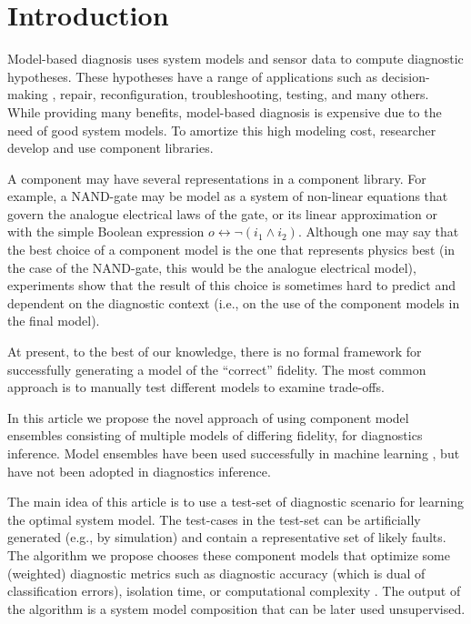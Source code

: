 \section{Introduction}
%
Model-based diagnosis \cite{dekleer87diagnosing} uses system models
and sensor data to compute diagnostic hypotheses. These hypotheses
have a range of applications such as decision-making
\cite{feldman13genius}, repair, reconfiguration, troubleshooting,
testing, and many others. While providing many benefits, model-based
diagnosis is expensive due to the need of good system models. To
amortize this high modeling cost, researcher develop and use component
libraries.
\par
A component may have several representations in a component
library. For example, a NAND-gate may be model as a system of
non-linear equations that govern the analogue electrical laws of the
gate, or its linear approximation or with the simple Boolean
expression $o \leftrightarrow \neg(i_1 \wedge i_2)$. Although one may
say that the best choice of a component model is the one that
represents physics best (in the case of the NAND-gate, this would be
the analogue electrical model), experiments show that the result of
this choice is sometimes hard to predict and dependent on the
diagnostic context (i.e., on the use of the component models in the
final model).
\par
At present, to the best of our knowledge, there is no formal framework
for successfully generating a model of the ``correct'' fidelity. The
most common approach is to manually test different models to examine
trade-offs.
\par
In this article we propose the novel approach of using component model
ensembles consisting of multiple models of differing fidelity, for
diagnostics inference. Model ensembles have been used successfully in
machine learning \citep{brown2010ensemble,dietterich2000ensemble}, but
have not been adopted in diagnostics inference.
\par
The main idea of this article is to use a test-set of diagnostic
scenario for learning the optimal system model. The test-cases in the
test-set can be artificially generated (e.g., by simulation) and
contain a representative set of likely faults. The algorithm we
propose chooses these component models that optimize some (weighted)
diagnostic metrics such as diagnostic accuracy (which is dual of
classification errors), isolation time, or computational complexity
\cite{feldman10empirical}. The output of the algorithm is a system
model composition that can be later used unsupervised.
